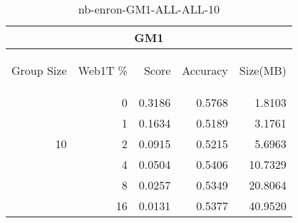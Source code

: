 \begin{center}
\begin{table}[htbp] 
 \begin{center}
\begin{tabular}{ | r | r | r | r | r |}
\hline
\multicolumn{5}{|c|}{GM1}\\
\hline
\begin{sideways}Group Size\end{sideways} & \begin{sideways}Web1T \%\end{sideways} & \begin{sideways}Score\end{sideways} & \begin{sideways}Accuracy\end{sideways} & \begin{sideways}Size(MB)\end{sideways}\\
\hline
\multirow{5}{*}{10}
 & 0 & 0.3186 & 0.5768 & 1.8103\\ \cline{2-5}
 & 1 & 0.1634 & 0.5189 & 3.1761\\ \cline{2-5}
 & 2 & 0.0915 & 0.5215 & 5.6963\\ \cline{2-5}
 & 4 & 0.0504 & 0.5406 & 10.7329\\ \cline{2-5}
 & 8 & 0.0257 & 0.5349 & 20.8064\\ \cline{2-5}
 & 16 & 0.0131 & 0.5377 & 40.9520\\ \cline{2-5}
\hline
\end{tabular}
\caption{nb-enron-GM1-ALL-ALL-10}
\label{table:nb-enron-GM1-ALL-ALL-10}
\end{center}
 \end{table}
\end{center}

